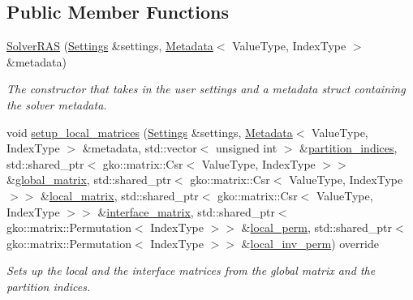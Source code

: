 \subsection*{Public Member Functions}
\begin{DoxyCompactItemize}
\item 
\hyperlink{classSchwarzWrappers_1_1SolverRAS_a4bd8f19ab2a959f1d56bac3939aa5f5f}{Solver\+R\+AS} (\hyperlink{structSchwarzWrappers_1_1Settings}{Settings} \&settings, \hyperlink{structSchwarzWrappers_1_1Metadata}{Metadata}$<$ Value\+Type, Index\+Type $>$ \&metadata)
\begin{DoxyCompactList}\small\item\em The constructor that takes in the user settings and a metadata struct containing the solver metadata. \end{DoxyCompactList}\item 
void \hyperlink{classSchwarzWrappers_1_1SolverRAS_ab44245cb5dede72cd11502cf59593626}{setup\+\_\+local\+\_\+matrices} (\hyperlink{structSchwarzWrappers_1_1Settings}{Settings} \&settings, \hyperlink{structSchwarzWrappers_1_1Metadata}{Metadata}$<$ Value\+Type, Index\+Type $>$ \&metadata, std\+::vector$<$ unsigned int $>$ \&\hyperlink{classSchwarzWrappers_1_1Initialize_a9ad20884882db7c28560d9f9755e571e}{partition\+\_\+indices}, std\+::shared\+\_\+ptr$<$ gko\+::matrix\+::\+Csr$<$ Value\+Type, Index\+Type $>$$>$ \&\hyperlink{classSchwarzWrappers_1_1SchwarzBase_a7dc6207713163fb9298ff2667da9a11f}{global\+\_\+matrix}, std\+::shared\+\_\+ptr$<$ gko\+::matrix\+::\+Csr$<$ Value\+Type, Index\+Type $>$$>$ \&\hyperlink{classSchwarzWrappers_1_1SchwarzBase_acb13eabad587af925145b408946b8c2d}{local\+\_\+matrix}, std\+::shared\+\_\+ptr$<$ gko\+::matrix\+::\+Csr$<$ Value\+Type, Index\+Type $>$$>$ \&\hyperlink{classSchwarzWrappers_1_1SchwarzBase_aea6575d93a87dec1f97ef2f40ff87199}{interface\+\_\+matrix}, std\+::shared\+\_\+ptr$<$ gko\+::matrix\+::\+Permutation$<$ Index\+Type $>$$>$ \&\hyperlink{classSchwarzWrappers_1_1SchwarzBase_a8cd51eb96cdf7f84de772fda54566a09}{local\+\_\+perm}, std\+::shared\+\_\+ptr$<$ gko\+::matrix\+::\+Permutation$<$ Index\+Type $>$$>$ \&\hyperlink{classSchwarzWrappers_1_1SchwarzBase_ae8862a67facde156ffef342410f979ba}{local\+\_\+inv\+\_\+perm}) override
\begin{DoxyCompactList}\small\item\em Sets up the local and the interface matrices from the global matrix and the partition indices. \end{DoxyCompactList}\item 
$$
\end{DoxyCompactItemize}
